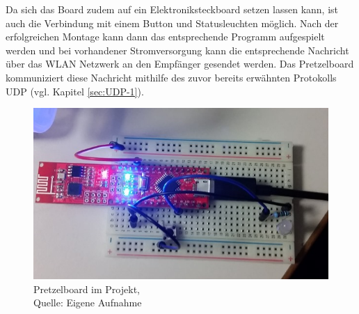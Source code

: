 Da sich das Board zudem auf ein Elektroniksteckboard setzen lassen kann, ist auch die Verbindung mit einem Button und Statusleuchten möglich. Nach der erfolgreichen Montage kann dann das entsprechende Programm aufgespielt werden und bei vorhandener Stromversorgung kann die entsprechende Nachricht über das \ac{WLAN} Netzwerk an den Empfänger gesendet werden. Das Pretzelboard kommuniziert diese Nachricht mithilfe des zuvor bereits erwähnten Protokolls \ac{UDP} (vgl. Kapitel \ref{sec:UDP-1}).


\begin{figure}[!htb]
	\centering
	\includegraphics[scale=0.6]{Pretzel_Projekt.jpg}
	\caption[Pretzelboard im Projekt]{Pretzelboard im Projekt,\\ Quelle: Eigene Aufnahme}
\end{figure}
